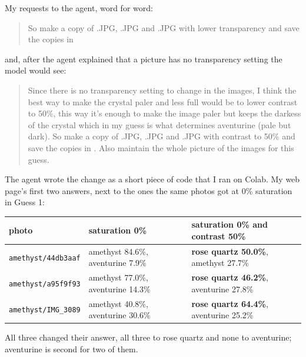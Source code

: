 \documentclass[11pt]{article}
\begin{document}
My requests to the agent, word for word:
\begin{quote}
So make a copy of
.JPG,
.JPG
and .JPG with lower transparency
and save the copies in 
\end{quote}
and, after the agent explained that a picture has no transparency setting the
model would see:
\begin{quote}
Since there is no transparency setting to change in the images, I think the
best way to make the crystal paler and less full would be to lower contrast to
50\%, this way it's enough to make the image paler but keeps the darkess of the
crystal which in my guess is what determines aventurine (pale but dark). So make
a copy of
.JPG,
.JPG
and .JPG with contrast to 50\%
and save the copies in .
Also maintain the whole picture of the images for this guess.
\end{quote}

The agent wrote the change as a short piece of code that I ran on Colab. My web
page's first two answers, next to the ones the same photos got at 0\%
saturation in Guess 1:

\begin{center}\footnotesize
\begin{tabular}{lll}
\toprule
photo & saturation 0\% & saturation 0\% and contrast 50\% \\
\midrule
\texttt{amethyst/44db3aaf} & amethyst 84.6\%, aventurine 7.9\% & \textbf{rose quartz 50.0\%}, amethyst 27.7\% \\
\texttt{amethyst/a95f9f93} & amethyst 77.0\%, aventurine 14.3\% & \textbf{rose quartz 46.2\%}, aventurine 27.8\% \\
\texttt{amethyst/IMG\_3089} & amethyst 40.8\%, aventurine 30.6\% & \textbf{rose quartz 64.4\%}, aventurine 25.2\% \\
\bottomrule
\end{tabular}
\end{center}

All three changed their answer, all three to rose quartz and none to aventurine;
aventurine is second for two of them.
\end{document}
